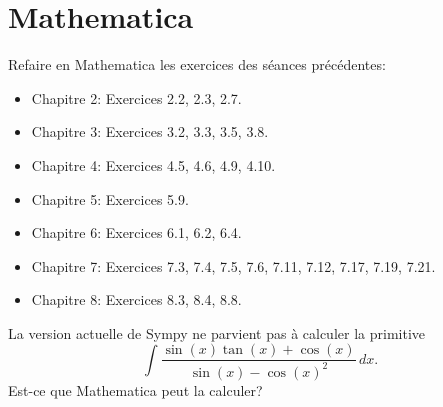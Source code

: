 
\section{Mathematica}

\begin{exercice}
    Refaire en Mathematica les exercices des séances précédentes:
    \begin{itemize}
	\item Chapitre 2: Exercices 2.2, 2.3, 2.7.
	\item Chapitre 3: Exercices 3.2, 3.3, 3.5, 3.8.
	\item Chapitre 4: Exercices 4.5, 4.6, 4.9, 4.10.
	\item Chapitre 5: Exercices 5.9.
	\item Chapitre 6: Exercices 6.1, 6.2, 6.4.
	\item Chapitre 7: Exercices 7.3, 7.4, 7.5, 7.6, 7.11, 7.12, 7.17,
	    7.19, 7.21.
	\item Chapitre 8: Exercices 8.3, 8.4, 8.8.
    \end{itemize}
\end{exercice}

\begin{exercice}
    La version actuelle de Sympy ne parvient pas à calculer la primitive
    \[
	\int \frac{\sin(x)\tan(x)+\cos(x)}{\sin(x)-\cos(x)^2}\,dx.
    \]
    Est-ce que Mathematica peut la calculer?
\end{exercice}


